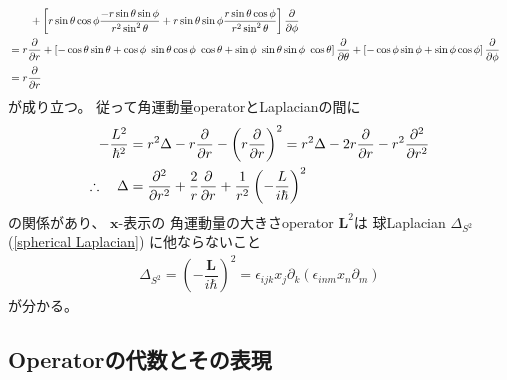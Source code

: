 \begin{align}
\notag\\&\qquad
    +
    \left[
        r \sin \theta \cos \phi
        \dfrac{
            - r \sin \theta
            \sin \phi
        }{ r^2 \sin^2 \theta }
    +
        r \sin \theta \sin \phi
        \dfrac{
            r \sin \theta
            \cos \phi
        }{
            r^2 \sin^2 \theta
        }
    \right]
    \dfrac{\partial}{\partial \phi}
\notag\\&
=
    r
    \dfrac{\partial}{\partial r}
    +
    \left[
        - \cos \theta
        \sin \theta
    +
        \cos \phi\ 
            \sin \theta \cos \phi\ 
            \cos \theta
    +
        \sin \phi\ 
            \sin \theta \sin \phi\ 
            \cos \theta
    \right]
    \dfrac{\partial}{\partial \theta}
    +
    \left[
        - \cos \phi
        \sin \phi
    +
        \sin \phi
        \cos \phi
    \right]
    \dfrac{\partial}{\partial \phi}
\notag\\&
=
    r \dfrac{\partial}{\partial r}
\end{align}
が成り立つ。
従って角運動量operatorとLaplacianの間に
\begin{align}
    - \dfrac{L^2}{\hbar^2}
&=
    r^2 \Delta
    -
        r \dfrac{\partial}{\partial r}
    -
        \left(
            r \dfrac{\partial}{\partial r}
        \right)^2
=
    r^2 \Delta
    -
        2 r
        \dfrac{\partial}{\partial r}
    -
        r^2
        \dfrac{\partial^2}{\partial r^2}
\notag\\\therefore
\quad
    \Delta
&=
    \dfrac{\partial^2}{\partial r^2}
    +
    \dfrac{2}{r}
    \dfrac{\partial}{\partial r}
    +
    \dfrac{1}{r^2}
    \left(
        -
        \dfrac{L}{i \hbar}
    \right)^2
\end{align}
の関係があり、
$\bm{x}$-表示の
角運動量の大きさoperator
$\bm{L}^2$は
球Laplacian $\Delta_{S^2}$
(\ref{spherical Laplacian})
に他ならないこと
\begin{align}
    \Delta_{S^2}
=
    \left(
        -
        \dfrac{\bm{L}}{i \hbar}
    \right)^2
=
    \epsilon_{ijk}
    x_j \partial_k
    (\epsilon_{inm}
    x_n \partial_m)
\end{align}
が分かる。

\subsection{Operatorの代数とその表現}

